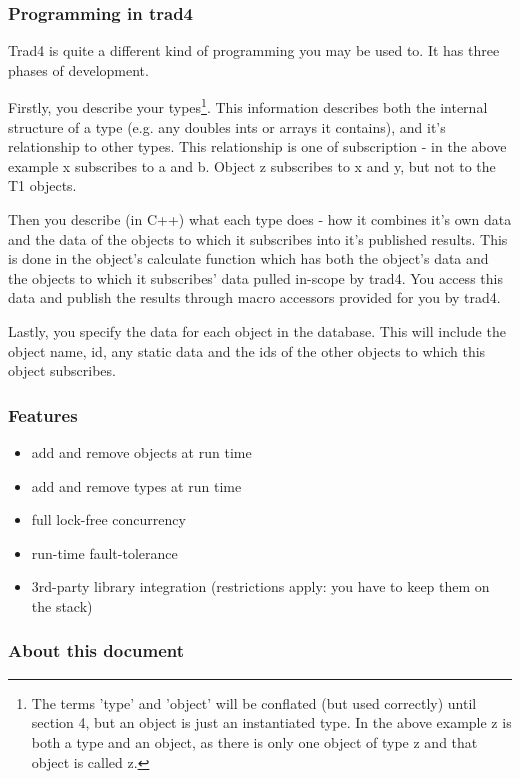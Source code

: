 \documentclass{report}
\begin{document}
\subsubsection{Programming in trad4}

Trad4 is quite a different kind of programming you may be used to. It has three phases of development.

Firstly, you describe your types\footnote{The terms 'type' and 'object' will be conflated (but used correctly) until section 4, but an object is just an instantiated type. In the above example z is both a type and an object, as there is only one object of type z and that object is called z.}. This information describes both the internal structure of a type (e.g. any doubles ints or arrays it contains), and it's relationship to other types. This relationship is one of subscription - in the above example x subscribes to a and b. Object z subscribes to x and y, but not to the T1 objects.

Then you describe (in C++) what each type does - how it combines it's own data and the data of the objects to which it subscribes into it's published results. This is done in the object's calculate function which has both the object's data and the objects to which it subscribes' data pulled in-scope by trad4. You access this data and publish the results through macro accessors provided for you by trad4.

Lastly, you specify the data for each object in the database. This will include the object name, id, any static data and the ids of the other objects to which this object subscribes.

\subsubsection{Features}

\begin{itemize}
\item add and remove objects at run time
\item add and remove types at run time
\item full lock-free concurrency
\item run-time fault-tolerance
\item 3rd-party library integration (restrictions apply: you have to keep them on the stack)
\end{itemize}

\subsubsection{About this document}
\end{document}
